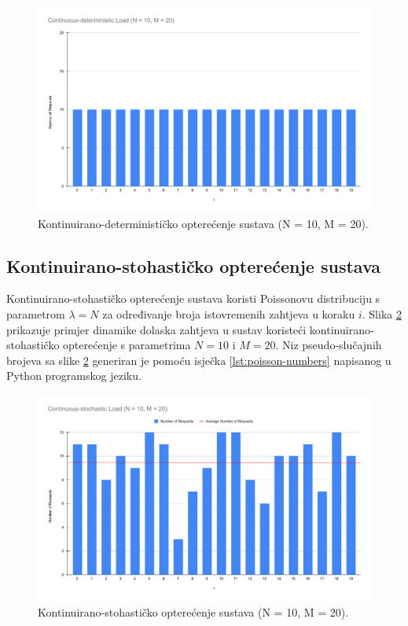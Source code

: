 \documentclass[times, utf8, diplomski]{fer}
\begin{document}
\begin{figure}[htb]
	\centering
	\includegraphics[width=\textwidth]{images/Continuous-deterministic Load (N = 10, M = 20).pdf}
	\caption{
		Kontinuirano-determinističko opterećenje sustava (N = 10, M = 20).
	}
	\label{fig:deterministic-load}
\end{figure}

\subsection{Kontinuirano-stohastičko opterećenje sustava}
Kontinuirano-stohastičko opterećenje sustava koristi Poissonovu distribuciju s parametrom $\lambda = N$ za određivanje broja istovremenih zahtjeva u koraku $i$. Slika \ref{fig:stochastic-load} prikazuje primjer dinamike dolaska zahtjeva u sustav koristeći kontinuirano-stohastičko opterećenje s parametrima $N=10$ i $M=20$. Niz pseudo-slučajnih brojeva sa slike \ref{fig:stochastic-load} generiran je pomoću isječka \ref{lst:poisson-numbers} napisanog u Python programskog jeziku.

\begin{figure}[htb]
	\centering
	\includegraphics[width=\textwidth]{images/Continuous-stochastic Load (N = 10, M = 20).pdf}
	\caption{
		Kontinuirano-stohastičko opterećenje sustava (N = 10, M = 20).
	}
	\label{fig:stochastic-load}
\end{figure}
\end{document}
